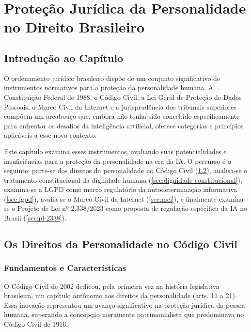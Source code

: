 
\chapter{Proteção Jurídica da Personalidade no Direito Brasileiro}
\label{cap:protecao-juridica}

\section{Introdução ao Capítulo}
\label{sec:intro-cap4}

O ordenamento jurídico brasileiro dispõe de um conjunto significativo de instrumentos normativos para a proteção da personalidade humana. A Constituição Federal de 1988, o Código Civil, a Lei Geral de Proteção de Dados Pessoais, o Marco Civil da Internet e a jurisprudência dos tribunais superiores compõem um arcabouço que, embora não tenha sido concebido especificamente para enfrentar os desafios da inteligência artificial, oferece categorias e princípios aplicáveis a esse novo contexto.

Este capítulo examina esses instrumentos, avaliando suas potencialidades e insuficiências para a proteção da personalidade na era da IA. O percurso é o seguinte: parte-se dos direitos da personalidade no Código Civil (\ref{sec:direitos-personalidade-cc}), analisa-se o tratamento constitucional da dignidade humana (\ref{sec:dignidade-constitucional}), examina-se a LGPD como marco regulatório da autodeterminação informativa (\ref{sec:lgpd}), avalia-se o Marco Civil da Internet (\ref{sec:mci}), e finalmente examina-se o Projeto de Lei nº 2.338/2023 como proposta de regulação específica da IA no Brasil (\ref{sec:pl-2338}).

\section{Os Direitos da Personalidade no Código Civil}
\label{sec:direitos-personalidade-cc}

\subsection{Fundamentos e Características}
\label{subsec:fundamentos-direitos-personalidade}

O Código Civil de 2002 dedicou, pela primeira vez na história legislativa brasileira, um capítulo autônomo aos direitos da personalidade (arts. 11 a 21). Essa inovação representou um avanço significativo na proteção jurídica da pessoa humana, superando a concepção meramente patrimonialista que predominava no Código Civil de 1916.

